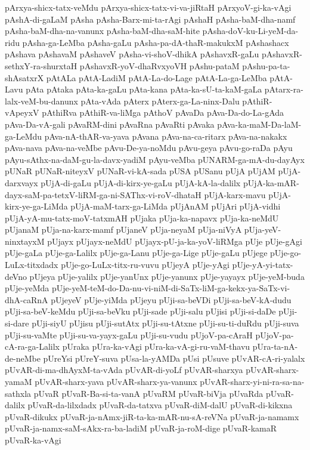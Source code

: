 {pArxya-shicx-tatx-veMdu
pArxya-shicx-tatx-vi-va-jiRtaH
pArxyoV-gi-ka-vAgi
pAshA-di-gaLaM
pAsha
pAsha-Barx-mi-ta-rAgi
pAshaH
pAsha-baM-dha-namf
pAsha-baM-dha-na-vanunx
pAsha-baM-dha-saM-hite
pAsha-doV-ku-Li-yeM-da-ridu
pAsha-ga-LeMba
pAsha-gaLu
pAsha-pa-dA-thaR-makukxM
pAshashacx
pAshava
pAshavaM
pAshaveV
pAsha-vi-shoV-dhikA
pAshavxR-gaLu
pAshavxR-sethxY-ra-shurxtaH
pAshavxR-yoV-dhaRvxyoVH
pAshu-pataM
pAshu-pa-ta-shAsatxrX
pAtALa
pAtA-LadiM
pAtA-La-do-Lage
pAtA-La-ga-LeMba
pAtA-Lavu
pAta
pAtaka
pAta-ka-gaLu
pAta-kana
pAta-ka-sU-ta-kaM-gaLa
pAtarx-ra-lalx-veM-bu-danunx
pAta-vAda
pAterx
pAterx-ga-La-ninx-Dalu
pAthiR-vApeyxV
pAthiRva
pAthiR-va-liMga
pAthoV
pAvaDa
pAva-Da-do-La-gAda
pAva-Da-vA-gali
pAvaRM-dini
pAvaRna
pAvaRti
pAvaka
pAva-ka-maM-Da-laM-ga-LeMdu
pAva-nA-thAR-va-yava
pAvana
pAva-na-ca-ritarx
pAva-na-nakakx
pAva-nava
pAva-na-veMbe
pAvu-De-ya-noMdu
pAvu-geya
pAvu-go-raDa
pAyu
pAyu-sAthx-na-daM-gu-la-davx-yadiM
pAyu-veMba
pUNARM-ga-mA-du-dayAyx
pUNaR
pUNaR-niteyxV
pUNaR-vi-kA-sada
pUSA
pUSanu
pUjA
pUjAM
pUjA-darxvayx
pUjA-di-gaLu
pUjA-di-kirx-ye-gaLu
pUjA-kA-la-dalilx
pUjA-ka-mAR-dayx-saM-pa-tetxV-liRM-ga-ni-SAThx-vi-roV-dhataH
pUjA-karx-mavu
pUjA-kirx-ye-ga-LiMda
pUjA-maM-tarx-ga-LiMda
pUjAnAM
pUjAri
pUjA-vidhi
pUjA-yA-mu-tatx-moV-tatxmAH
pUjaka
pUja-ka-napavx
pUja-ka-neMdU
pUjanaM
pUja-na-karx-mamf
pUjaneV
pUja-neyaM
pUja-niVyA
pUja-yeV-ninxtayxM
pUjayx
pUjayx-neMdU
pUjayx-pU-ja-ka-yoV-liRMga
pUje
pUje-gAgi
pUje-gaLa
pUje-ga-Lalilx
pUje-ga-Lanu
pUje-ga-Lige
pUje-gaLu
pUjege
pUje-go-LuLx-titxdadx
pUje-go-LuLx-titx-ru-vuvu
pUjeyA
pUje-yAgi
pUje-yA-yi-tatx-deVno
pUjeya
pUje-yalilx
pUje-yanUnx
pUje-yanunx
pUje-yayayx
pUje-yeM-buda
pUje-yeMda
pUje-yeM-teM-do-Da-nu-vi-niM-di-SaTx-liM-ga-kekx-ya-SaTx-vi-dhA-caRnA
pUjeyeV
pUje-yiMda
pUjeyu
pUji-sa-beVDi
pUji-sa-beV-kA-dudu
pUji-sa-beV-keMdu
pUji-sa-beVku
pUji-sade
pUji-salu
pUjisi
pUji-si-daDe
pUji-si-dare
pUji-siyU
pUjisu
pUji-sutAtx
pUji-su-tAtxne
pUji-su-ti-duRdu
pUji-suva
pUji-su-vaMte
pUji-su-va-yayx-gaLu
pUji-su-vudu
pUjoV-pa-cAraH
pUjoV-pa-cA-ra-ga-Lalilx
pUraka
pUra-ka-vAgi
pUra-ka-vA-gi-ru-vaM-thavu
pUra-ta-nA-de-neMbe
pUreYsi
pUreY-suva
pUsa-la-yAMDa
pUsi
pUsuve
pUvAR-cA-ri-yalalx
pUvAR-di-ma-dhAyxM-ta-vAda
pUvAR-di-yoLf
pUvAR-sharxya
pUvAR-sharx-yamaM
pUvAR-sharx-yava
pUvAR-sharx-ya-vanunx
pUvAR-sharx-yi-ni-ra-sa-na-sathxla
pUvaR
pUvaR-Ba-si-ta-vanA
pUvaRM
pUvaR-biVja
pUvaRda
pUvaR-dalilx
pUvaR-da-lilxdadx
pUvaR-da-tatxva
pUvaR-diM-dalU
pUvaR-di-kikxna
pUvaR-dikukx
pUvaR-ja-nAmx-jiR-ta-ka-mAR-nu-sA-reVNa
pUvaR-ja-namamx
pUvaR-ja-namx-saM-sAkx-ra-ba-ladiM
pUvaR-ja-roM-dige
pUvaR-kamaR
pUvaR-ka-vAgi
}
